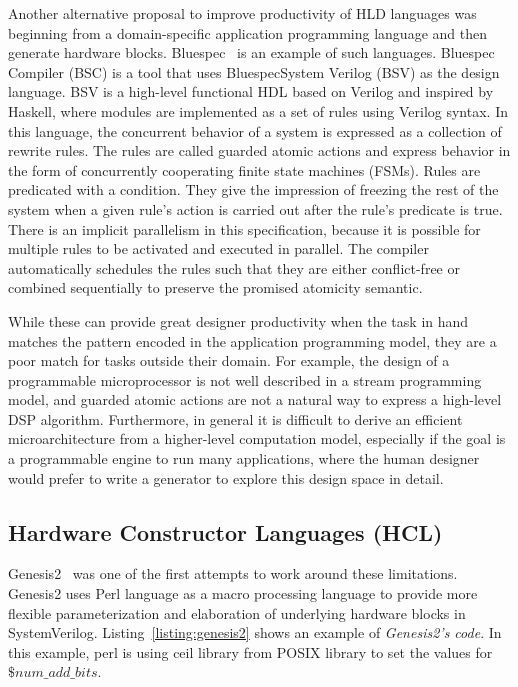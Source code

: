 Another alternative proposal to improve productivity of HLD languages was beginning from a domain-specific application programming language and then generate hardware blocks. 
Bluespec~\cite{bluespec} is an example of such languages.
Bluespec Compiler (BSC) is a tool that uses BluespecSystem  Verilog  (BSV)  as  the  design  language.
BSV is a high-level functional HDL based on Verilog and inspired by Haskell, where  modules are implemented as a set of rules using  Verilog  syntax.
In this language, the concurrent behavior of a system is expressed as a collection of rewrite rules.
The rules are called guarded atomic actions and express behavior in the form of concurrently cooperating finite state machines (FSMs).
Rules are predicated with a condition. They give the impression of freezing the rest of the system when a given rule's action is carried out after the rule's predicate is true.
There is an implicit parallelism in this specification, because it is possible for multiple rules to be activated and executed in parallel.
The compiler automatically schedules the rules such that they are either conflict-free or combined sequentially to preserve the promised atomicity semantic.

While these can provide great designer productivity when the task in hand matches the pattern encoded in the application programming model, they are a poor match for tasks outside their domain.
For example, the design of a programmable microprocessor is not well described in a stream
programming model, and guarded atomic actions are not a natural way to express a high-level DSP algorithm.
Furthermore, in general it is difficult to derive an efficient microarchitecture from a higher-level computation model, especially if the goal is a programmable engine to run many applications, where the human designer would prefer to write a generator to explore this design space in detail.


\subsection{Hardware Constructor Languages (HCL)}

Genesis2~\cite{genesis2} was one of the first attempts to work around these limitations. Genesis2 uses Perl language as a macro processing language to provide more flexible parameterization and elaboration of underlying hardware blocks in SystemVerilog. Listing~\ref{listing:genesis2} shows an example of \textit{Genesis2's code}.
In this example, perl is using ceil library from POSIX library to set the values for $\$num\_add\_bits$.

